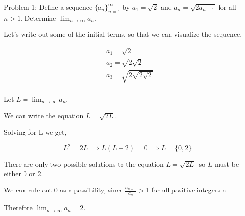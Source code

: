 Problem 1: Define a sequence $\{a_n\}_{n=1}^\infty$ by $a_1 = \sqrt{2}$ and $a_n = \sqrt{2a_{n-1}}$ for all $n > 1$. Determine $\displaystyle\lim_{n \rightarrow \infty} a_n$.

Let's write out some of the initial terms, so that we can visualize the sequence.

\begin{align*}
& a_1 = \sqrt 2 \\
& a_2 = \sqrt{2 \sqrt 2} \\
& a_3 = \sqrt{2 \sqrt{2 \sqrt 2}} \\
\end{align*}

Let $L = \displaystyle \lim_{n \rightarrow \infty} a_n$.

We can write the equation $L = \sqrt{2L}$.

Solving for L we get,

$$ L^2 = 2L \implies L(L - 2) = 0 \implies L = \{0, 2\} $$

There are only two possible solutions to the equation $L = \sqrt{2L}$, so $L$ must be either 0 or 2.

We can rule out 0 as a possibility, since $\frac{a_{n+1}}{a_n} > 1$ for all positive integers n.

Therefore $\boxed{\lim_{n \rightarrow \infty} a_n = 2}$.
